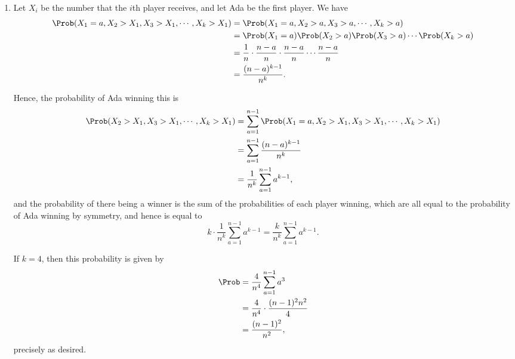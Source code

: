 \Question{\currfilebase}
\begin{enumerate}
    \item Let \(X_i\) be the number that the \(i\)th player receives, and let Ada be the first player. We have
          \begin{align*}
              \Prob(X_1 = a, X_2 > X_1, X_3 > X_1, \cdots, X_k > X_1) & = \Prob(X_1 = a, X_2 > a, X_3 > a, \cdots, X_k > a)                              \\
                                                                      & = \Prob(X_1 = a) \Prob(X_2 > a) \Prob(X_3 > a) \cdots \Prob(X_k > a)             \\
                                                                      & = \frac{1}{n} \cdot \frac{n - a}{n} \cdot \frac{n - a}{n} \cdots \frac{n - a}{n} \\
                                                                      & = \frac{(n - a)^{k - 1}}{n^k}.
          \end{align*}

          Hence, the probability of Ada winning this is
          \begin{align*}
              \Prob(X_2 > X_1, X_3 > X_1, \cdots, X_k > X_1) & = \sum_{a = 1}^{n - 1} \Prob(X_1 = a, X_2 > X_1, X_3 > X_1, \cdots, X_k > X_1) \\
                                                             & = \sum_{a = 1}^{n - 1} \frac{(n - a)^{k - 1}}{n^k}                             \\
                                                             & = \frac{1}{n^k} \sum_{a = 1}^{n - 1} a^{k - 1},
          \end{align*}
          and the probability of there being a winner is the sum of the probabilities of each player winning, which are all equal to the probability of Ada winning by symmetry, and hence is equal to
          \[
              k \cdot \frac{1}{n^k} \sum_{a = 1}^{n - 1} a^{k - 1} = \frac{k}{n^k} \sum_{a = 1}^{n - 1} a^{k - 1}.
          \]

          If \(k = 4\), then this probability is given by
          \begin{align*}
              \Prob & = \frac{4}{n^4} \sum_{a = 1}^{n - 1} a^3      \\
                    & = \frac{4}{n^4} \cdot \frac{(n - 1)^2 n^2}{4} \\
                    & = \frac{(n - 1)^2}{n^2},
          \end{align*}
          precisely as desired.


\end{enumerate}
